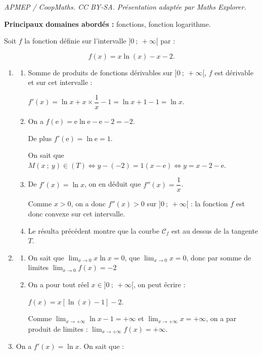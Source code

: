 \documentclass[10pt]{article}
\providecommand{\e}{{\mathrm{e}}}
\begin{document}
\noindent\textit{APMEP / CoopMaths. CC BY-SA. Présentation adaptée par Maths Explorer.}\par\medskip
\textbf{Principaux domaines abordés :} fonctions, fonction logarithme.

\medskip

Soit $f$ la fonction définie sur l'intervalle $]0~;~+\infty[$ par :

\[f(x) = x \ln (x) - x - 2.\]







\begin{enumerate}
\item 
	\begin{enumerate}
		\item 
		Somme de produits de fonctions dérivables sur $]0~;~+\infty[$, \: $f$ est dérivable et sur cet intervalle :
		
		$f'(x) = \ln x + x \times \dfrac1x - 1 = \ln x + 1 - 1 = \ln x$.
		\item 
On a $f(\text{e}) = \e \ln \e - \e - 2 = - 2$.

De plus $f'(\e) = \ln \e = 1$.

On sait que $M(x~;~y) \in (T) \iff y - (- 2) = 1(x - \e) \iff y = x - 2 - \e$.
		\item 
De $f'(x) = \ln x$, on en déduit que $f''(x) = \dfrac1x$.

Comme $x > 0$, on a donc $f''(x) > 0$ sur $]0~;~+\infty[$ : la fonction $f$ est donc convexe sur cet intervalle.
		\item 
		Le résulta précédent montre que la courbe $\mathcal{C}_f$ est au dessus de la tangente $T$.
	\end{enumerate}	
\item 
	\begin{enumerate}
		\item 
On sait que $\displaystyle\lim_{x \to 0} x \ln x = 0$, que $\displaystyle\lim_{x \to 0} x  = 0$, donc par somme de limites $\displaystyle\lim_{x \to 0} f(x) = - 2$
		\item 
On a pour tout réel $x \in ]0~;~+ \infty[$, on peut écrire :

$f(x) = x\left[\ln (x) - 1\right] - 2$.

Comme $\displaystyle\lim_{x \to + \infty} \ln x - 1 = + \infty$ et $\displaystyle\lim_{x \to + \infty} x = + \infty$, on a par produit de limites : $\displaystyle\lim_{x \to + \infty} f(x) = + \infty$.
	\end{enumerate}
\item 
On a $f'(x) = \ln x$. On sait que :


\end{enumerate}
\end{document}

